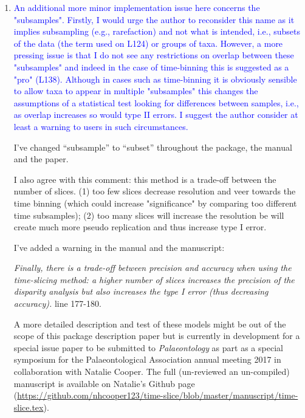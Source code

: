 \documentclass[12pt,letterpaper]{article}
\begin{document}
\begin{enumerate}
\item{\textcolor{blue}{An additional more minor implementation issue here concerns the "subsamples". Firstly, I would urge the author to reconsider this name as it implies subsampling (e.g., rarefaction) and not what is intended, i.e., subsets of the data (the term used on L124) or groups of taxa. However, a more pressing issue is that I do not see any restrictions on overlap between these "subsamples" and indeed in the case of time-binning this is suggested as a "pro" (L138). Although in cases such as time-binning it is obviously sensible to allow taxa to appear in multiple "subsamples" this changes the assumptions of a statistical test looking for differences between samples, i.e., as overlap increases so would type II errors. I suggest the author consider at least a warning to users in such circumstances.}}

I've changed ``subsample'' to ``subset'' throughout the package, the manual and the paper.

I also agree with this comment: this method is a trade-off between the number of slices.
(1) too few slices decrease resolution and veer towards the time binning (which could increase "significance" by comparing too different time subsamples);
(2) too many slices will increase the resolution be will create much more pseudo replication and thus increase type I error.

I've added a warning in the manual and the manuscript:

\textit{Finally, there is a trade-off between precision and accuracy when using the time-slicing method: a higher number of slices increases the precision of the disparity analysis but also increases the type I error (thus decreasing accuracy).} line 177-180.


A more detailed description and test of these models might be out of the scope of this package description paper but is currently in development for a special issue paper to be submitted to \textit{Palaeontology} as part as a special symposium for the Palaeontological Association annual meeting 2017 in collaboration with Natalie Cooper.
The full (un-reviewed an un-compiled) manuscript is available on Natalie's Github page (\url{https://github.com/nhcooper123/time-slice/blob/master/manuscript/time-slice.tex}).



\end{enumerate}
\end{document}
